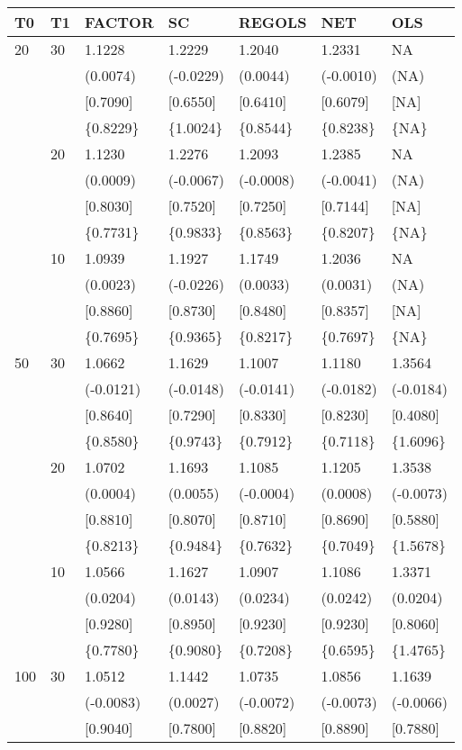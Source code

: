 \begin{table}[ht]
\centering
\begin{tabular}{lllllll}
\hline
T0&T1&FACTOR&SC&REGOLS&NET&OLS\\
\hline
20&30&1.1228&1.2229&1.2040&1.2331&NA\\
&&(0.0074)&(-0.0229)&(0.0044)&(-0.0010)&(NA)\\
&&[0.7090]&[0.6550]&[0.6410]&[0.6079]&[NA]\\
&&\{0.8229\}&\{1.0024\}&\{0.8544\}&\{0.8238\}&\{NA\}\\
&20&1.1230&1.2276&1.2093&1.2385&NA\\
&&(0.0009)&(-0.0067)&(-0.0008)&(-0.0041)&(NA)\\
&&[0.8030]&[0.7520]&[0.7250]&[0.7144]&[NA]\\
&&\{0.7731\}&\{0.9833\}&\{0.8563\}&\{0.8207\}&\{NA\}\\
&10&1.0939&1.1927&1.1749&1.2036&NA\\
&&(0.0023)&(-0.0226)&(0.0033)&(0.0031)&(NA)\\
&&[0.8860]&[0.8730]&[0.8480]&[0.8357]&[NA]\\
&&\{0.7695\}&\{0.9365\}&\{0.8217\}&\{0.7697\}&\{NA\}\\
50&30&1.0662&1.1629&1.1007&1.1180&1.3564\\
&&(-0.0121)&(-0.0148)&(-0.0141)&(-0.0182)&(-0.0184)\\
&&[0.8640]&[0.7290]&[0.8330]&[0.8230]&[0.4080]\\
&&\{0.8580\}&\{0.9743\}&\{0.7912\}&\{0.7118\}&\{1.6096\}\\
&20&1.0702&1.1693&1.1085&1.1205&1.3538\\
&&(0.0004)&(0.0055)&(-0.0004)&(0.0008)&(-0.0073)\\
&&[0.8810]&[0.8070]&[0.8710]&[0.8690]&[0.5880]\\
&&\{0.8213\}&\{0.9484\}&\{0.7632\}&\{0.7049\}&\{1.5678\}\\
&10&1.0566&1.1627&1.0907&1.1086&1.3371\\
&&(0.0204)&(0.0143)&(0.0234)&(0.0242)&(0.0204)\\
&&[0.9280]&[0.8950]&[0.9230]&[0.9230]&[0.8060]\\
&&\{0.7780\}&\{0.9080\}&\{0.7208\}&\{0.6595\}&\{1.4765\}\\
100&30&1.0512&1.1442&1.0735&1.0856&1.1639\\
&&(-0.0083)&(0.0027)&(-0.0072)&(-0.0073)&(-0.0066)\\
&&[0.9040]&[0.7800]&[0.8820]&[0.8890]&[0.7880]\\

\end{tabular}
\end{table}
